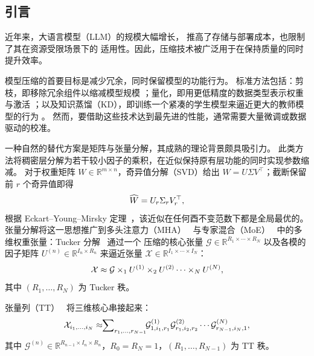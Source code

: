 \documentclass[11pt]{article}
\begin{document}
\begin{mainpart}

\allowdisplaybreaks
\vspace{-8mm}
\section{引言}
\label{sec:intro}

近年来，大语言模型（LLM）的规模大幅增长，
推高了存储与部署成本，也限制了其在资源受限场景下的
适用性。因此，压缩技术被广泛用于在保持质量的同时提升效率。

模型压缩的首要目标是减少冗余，同时保留模型的功能行为。
标准方法包括：剪枝，即移除冗余组件以缩减模型规模 \citep{OBC_2022, LLM_pruner_2023, unreasonable_ineffectiveness_2024}；量化，即用更低精度的数据类型表示权重与激活 \citep{GPTQ_2022, QUIP_2023, AQLM_2024, AWQ_2024, harp}；以及知识蒸馏（KD），即训练一个紧凑的学生模型来逼近更大的教师模型的行为 \citep{HintonDistil_2015, GKD_2023}。
然而，要借助这些技术达到最先进的性能，通常需要大量微调或数据驱动的校准。

一种自然的替代方案是矩阵与张量分解，其成熟的理论背景颇具吸引力。
此类方法将稠密层分解为若干较小因子的乘积，在近似保持原有层功能的同时实现参数缩减。
对于权重矩阵 $W \in \mathbb{R}^{m \times n}$，奇异值分解（SVD）给出 $W = U\Sigma V^\top$；截断保留前 $r$ 个奇异值即得
\begin{equation}
\label{eq:svd}
\vspace{-1mm}
\widehat{W} = U_r\Sigma_r V_r^\top, 
\end{equation}
根据 Eckart--Young--Mirsky 定理~\citep{Eckart_Young_1936, Eckart_Young_Mirsky_1960}，该近似在任何酉不变范数下都是全局最优的。
张量分解将这一思想推广到多头注意力（MHA）~\citep{Attention_Is_All_You_Need_2017} 与专家混合（MoE）~\citep{MoE_2022} 中的多维权重张量：Tucker 分解~\citep{tucker1966some, kolda2009tensor} 通过一个
压缩的核心张量 $\mathcal{G} \in \mathbb{R}^{R_1 \times \cdots \times R_N}$
以及各模的因子矩阵 $U^{(n)} \in \mathbb{R}^{I_n \times R_n}$ 来逼近张量
$\mathcal{X} \in \mathbb{R}^{I_1 \times \cdots \times I_N}$：
\begin{equation}
    \label{eq:tucker}
    \vspace{-2mm}
    \mathcal{X} \approx \mathcal{G} \times_1 U^{(1)} \times_2 U^{(2)}
    \cdots \times_N U^{(N)},
\end{equation}
其中 $(R_1,\ldots,R_N)$ 为 Tucker 秩。

张量列（TT）~\citep{oseledets2011tensor} 将三维核心串接起来：
\begin{equation}
    \label{eq:tt}
    \vspace{-2mm}
    \mathcal{X}_{i_1,\ldots,i_N} \approx \!\!\sum\nolimits_{r_1,\ldots,r_{N-1}}\!\! \mathcal{G}^{(1)}_{1,i_1,r_1}\mathcal{G}^{(2)}_{r_1,i_2,r_2} \cdots \mathcal{G}^{(N)}_{r_{N-1},i_N,1},
\end{equation}
其中 $\mathcal{G}^{(n)} \in \mathbb{R}^{R_{n-1} \times I_n \times R_n}$，$R_0 = R_N = 1$，$(R_1,\ldots,R_{N-1})$ 为 TT 秩。


\end{mainpart}
\end{document}
